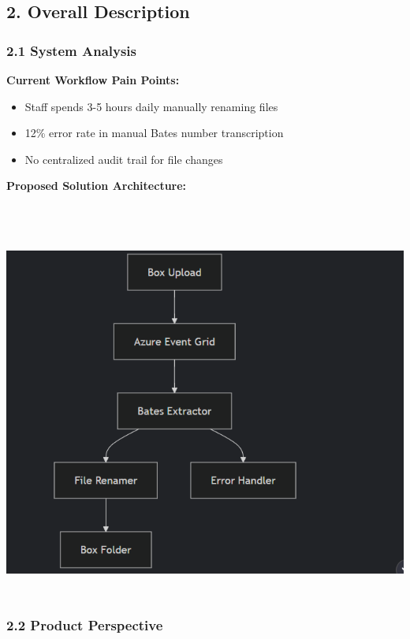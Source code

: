 \documentclass[
]{article}
\providecommand{\tightlist}{%
  \setlength{\itemsep}{0pt}\setlength{\parskip}{0pt}}
\begin{document}
\hypertarget{overall-description}{%
\subsection{\texorpdfstring{\textbf{2. Overall
Description}}{2. Overall Description}}\label{overall-description}}

\hypertarget{system-analysis}{%
\subsubsection{\texorpdfstring{\textbf{2.1 System
Analysis}}{2.1 System Analysis}}\label{system-analysis}}

\textbf{Current Workflow Pain Points:}

\begin{itemize}
\tightlist
\item
  Staff spends 3-5 hours daily manually renaming files
\item
  12\% error rate in manual Bates number transcription
\item
  No centralized audit trail for file changes
\end{itemize}

\textbf{Proposed Solution Architecture:}

\hypertarget{product-perspective}{%
\subsubsection[\textbf{2.2 Product
Perspective}]{\texorpdfstring{\protect\includegraphics[width=6.5in,height=5.29514in]{image1.png}\textbf{2.2
Product
Perspective}}{2.2 Product Perspective}}\label{product-perspective}}
\end{document}
